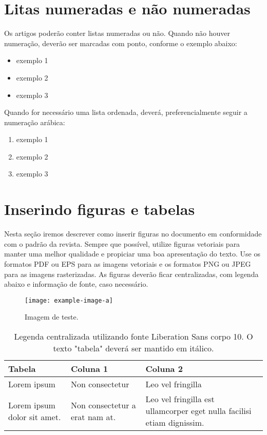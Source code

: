 \documentclass[red]{textolivre}
\begin{document}
\section{Litas numeradas e não numeradas}
Os artigos poderão conter listas numeradas ou não. Quando não houver numeração, deverão ser marcadas com ponto, conforme o exemplo abaixo: 
\begin{itemize}
\item exemplo 1
\item exemplo 2
\item exemplo 3
\end{itemize}

Quando for necessário uma lista ordenada, deverá, preferencialmente seguir a numeração arábica:
\begin{enumerate}
\item exemplo 1
\item exemplo 2
\item exemplo 3
\end{enumerate}

\section{Inserindo figuras e tabelas}
Nesta seção iremos descrever como inserir figuras no documento em conformidade com o padrão da revista. Sempre que possível, utilize figuras vetoriais para manter uma melhor qualidade e propiciar uma boa apresentação do texto. Use os formatos PDF ou EPS para as imagens vetoriais e os formatos PNG ou JPEG para as imagens rasterizadas. As figuras deverão ficar centralizadas, com legenda abaixo e informação de fonte, caso necessário.

\begin{figure}[htbp]
 \centering
 \texttt{[image: example-image-a]}
 \caption{Imagem de teste.}
 \label{fig-img-a}
\end{figure}

\lipsum[12]


\begin{table}[htpb]
\caption{Legenda centralizada utilizando fonte Liberation Sans corpo 10. O texto "tabela" deverá ser mantido em itálico.}
\label{tbl-tabela-01}
\begin{tabular}{llp{5.5cm}}
\toprule 
Tabela                      & Coluna 1                       & Coluna 2                                                               \\ 
\midrule
Lorem ipsum                 & Non consectetur                & Leo vel fringilla                                                      \\ 
\midrule
Lorem ipsum dolor sit amet. & Non consectetur a erat nam at. & Leo vel fringilla est ullamcorper eget nulla facilisi etiam dignissim. \\ 
\bottomrule
\end{tabular}
\end{table}
\end{document}
